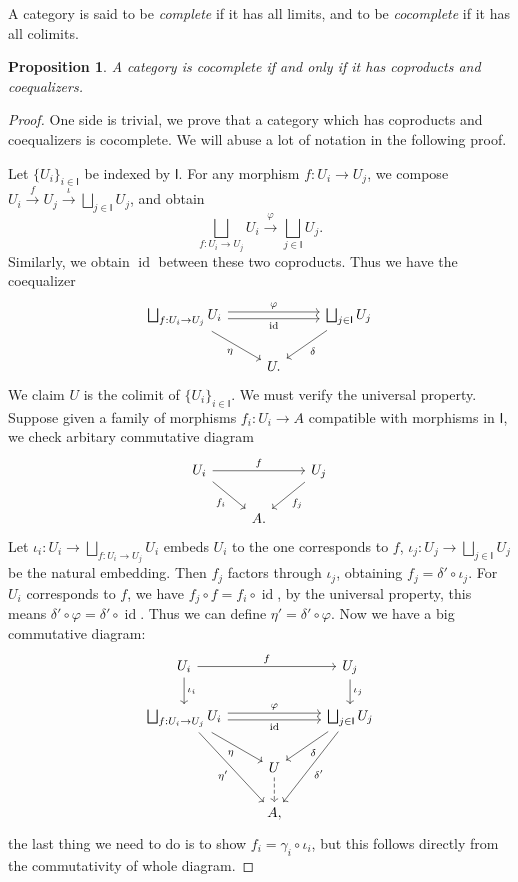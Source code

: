 \documentclass[a4paper]{amsart}
\theoremstyle{plain}
\newtheorem{prop}[thm]{Proposition}
\theoremstyle{definition}
\theoremstyle{remark}
\begin{document}
A category is said to be \emph{complete} if it has all limits, and to be \emph{cocomplete} if it has all colimits.
\begin{prop}
    A category is cocomplete if and only if it has coproducts and coequalizers.
\end{prop}
\begin{proof}
    One side is trivial, we prove that a category which has coproducts and coequalizers is cocomplete.
    We will abuse a lot of notation in the following proof.

    Let $\{U_i\}_{i\in\mathsf{I}}$ be indexed by $\mathsf{I}$.
    For any morphism $f:U_i\to U_j$, we compose $U_i\xrightarrow{f}U_j\xrightarrow{\iota}\bigsqcup_{j\in\mathsf{I}}U_j$, and obtain
    \[\bigsqcup_{f:U_i\to U_j}U_i\xrightarrow{\varphi}\bigsqcup_{j\in\mathsf{I}}U_j.\]
    Similarly, we obtain $\operatorname{id}$ between these two coproducts.
    Thus we have the coequalizer
    \[\begin{tikzcd}
        \bigsqcup_{f:U_i\to U_j}U_i \ar[rr, shift left, "\varphi"] \ar[rr, shift right, "{\operatorname{id}}"'] \ar[dr, "\eta"'] & & \bigsqcup_{j\in\mathsf{I}}U_j \ar[dl, "\delta"]\\
         & U. &
    \end{tikzcd}\]
    We claim $U$ is the colimit of $\{U_i\}_{i\in\mathsf{I}}$.
    We must verify the universal property.
    Suppose given a family of morphisms $f_i:U_i\to A$ compatible with morphisms in $\mathsf{I}$, we check arbitary commutative diagram
    \[\begin{tikzcd}
        U_i \ar[rr, "f"] \ar[dr, "{f_i}"'] & & U_j \ar[dl, "{f_j}"] \\
         & A. &
    \end{tikzcd}\]
    Let $\iota_i:U_i\to\bigsqcup_{f:U_i\to U_j}U_i$ embeds $U_i$ to the one corresponds to $f$, $\iota_j:U_j\to\bigsqcup_{j\in\mathsf{I}}U_j$ be the natural embedding.
    Then $f_j$ factors through $\iota_j$, obtaining $f_j=\delta'\circ\iota_j$.
    For $U_i$ corresponds to $f$, we have $f_j\circ f=f_i\circ\operatorname{id}$, by the universal property, this means $\delta'\circ\varphi=\delta'\circ\operatorname{id}$.
    Thus we can define $\eta'=\delta'\circ\varphi$.
    Now we have a big commutative diagram:
    \[\begin{tikzcd}
        U_i \ar[rr, "f"] \ar[d, "{\iota_i}"] & & U_j \ar[d, "{\iota_j}"]\\
        \bigsqcup_{f:U_i\to U_j} U_i \ar[rr, shift left, "\varphi"] \ar[rr, shift right, "\operatorname{id}"'] \ar[dr, "\eta"'] \ar[ddr, "{\eta'}"'] & & \bigsqcup_{j\in\mathsf{I}}U_j \ar[dl, "\delta"] \ar[ddl, "\delta'"] \\
         & U \ar[d, dashed] & \\
         & A, &
    \end{tikzcd}\]
    the last thing we need to do is to show $f_i=\gamma_i\circ\iota_i$, but this follows directly from the commutativity of whole diagram.
\end{proof}
\end{document}
